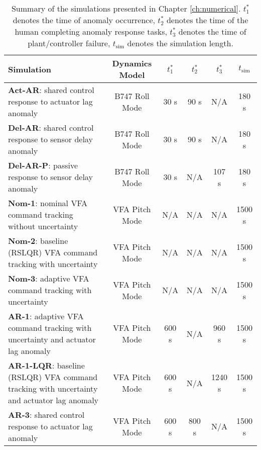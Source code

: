 \begin{table}[htb]
 \renewcommand{\arraystretch}{1.6}
  \begin{tabular}{>{\raggedright}m{2.2in}|c c c c c}
    \textbf{Simulation} & \textbf{Dynamics Model} & $t_1^*$ & $t_2^*$ & $t_3^*$ & $t_{\textrm{sim}}$ \\
    \hline
    \textbf{Act-AR}: shared control response to actuator lag anomaly & B747 Roll Mode &  30 s & 90 s & N/A & 180 s\\
    \textbf{Del-AR}: shared control response to sensor delay anomaly  & B747 Roll Mode & 30 s & 90 s & N/A & 180 s\\
    \textbf{Del-AR-P}: passive response to sensor delay anomaly  & B747 Roll Mode & 30 s & N/A & 107 s & 180 s\\ \hline
    \textbf{Nom-1}:  nominal VFA command tracking without uncertainty & VFA Pitch Mode & N/A & N/A & N/A & 1500 s\\
    \textbf{Nom-2}: baseline (RSLQR) VFA command tracking with uncertainty & VFA Pitch Mode & N/A & N/A & N/A & 1500 s\\
    \textbf{Nom-3}: adaptive VFA command tracking with uncertainty & VFA Pitch Mode & N/A & N/A & N/A & 1500 s\\ \hline
    \textbf{AR-1}: adaptive VFA command tracking with uncertainty and actuator lag anomaly & VFA Pitch Mode & 600 s & N/A & 960 s & 1500 s\\
    \textbf{AR-1-LQR}: baseline (RSLQR) VFA command tracking with uncertainty and actuator lag anomaly & VFA Pitch Mode & 600 s & N/A & 1240 s & 1500 s\\
    \textbf{AR-3}: shared control response to actuator lag anomaly & VFA Pitch Mode & 600 s & 800 s & N/A & 1500 s\\
  \end{tabular}
  \caption{Summary of the simulations presented in Chapter \ref{ch:numerical}. $t_1^*$ denotes the time of anomaly occurrence, $t_2^*$ denotes the time of the human completing anomaly response tasks, $t_3^*$ denotes the time of plant/controller failure, $t_{\textrm{sim}}$ denotes the simulation length.}
\end{table}

